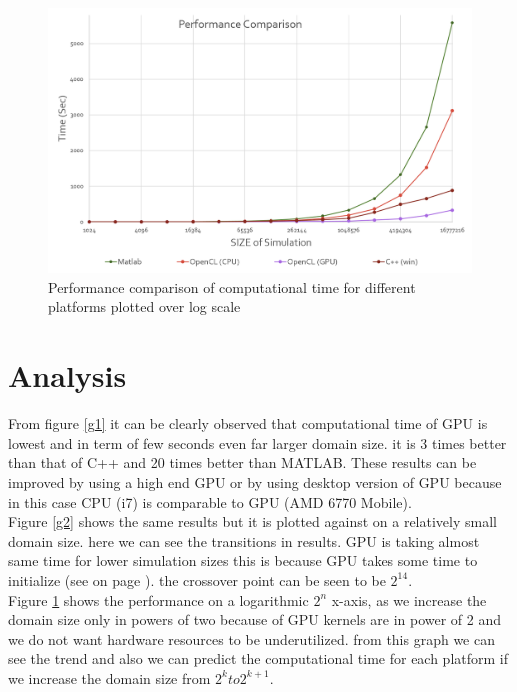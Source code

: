 \begin{figure}[htbp]
	\centering
		\includegraphics[width=6in]{Figures/g3.png}
	\caption[Performance Comparison on log scale]{Performance comparison of computational time for different platforms plotted over log scale}
	\label{g3}
\end{figure}

\section{Analysis }

From figure \ref{g1} it can be clearly observed that  computational time of GPU      is lowest and in term of few seconds even far larger domain size. it is 3 times better than that of C++ and           20 times better than MATLAB. These results can be improved by using a high end GPU or by using desktop version of GPU because in this case CPU (i7) is comparable to GPU (AMD 6770 Mobile).\\
Figure \ref{g2} shows the same results but it is plotted against on a relatively small domain size. here we can see the transitions in results. GPU is taking almost same time for lower simulation sizes this is because GPU takes some time to initialize  (see  on page \pageref{HostProgram}). the crossover point can be seen to be $2^{14}$.\\
Figure \ref{g3} shows the performance on a logarithmic $2^n$ x-axis, as we increase the domain size only in powers of two because of GPU kernels are in power of 2 and we do not want hardware resources to be underutilized. from this graph we can see the trend and also we can predict the computational time for each platform if we increase the domain size from $2^k  to  2^{k+1}$. 


